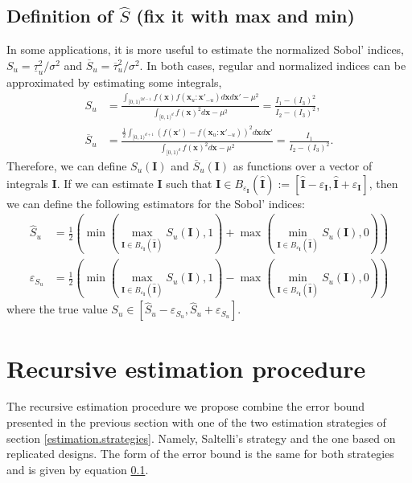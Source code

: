 \documentclass[]{elsarticle}
\theoremstyle{definition}
\newcommand{\bvec}[1]{\boldsymbol{#1}}
\newcommand{\vx}{\bvec{x}}
\newcommand{\vI}{\bvec{I}}
\begin{document}
\subsection{Definition of $\widehat{S}$ (fix it with max and min)}
In some applications, it is more useful to estimate the normalized Sobol' indices, $S_u = \underline{\tau}_u^2/\sigma^2$ and $\overline{S}_u = \overline{\tau}_u^2/\sigma^2$. In both cases, regular and normalized indices can be approximated by estimating some integrals,
\begin{align*}
S_u & = \frac{\int_{[0,1)^{2d-1}} f(\vx)f(\vx_{u}:{\vx'}_{-u})d\vx d{\vx'} - \mu^2 }{\int_{[0,1)^{d}} f(\vx)^2 d{\vx}-\mu^2} = \frac{I_1-(I_3)^2}{I_2-(I_3)^2}, \\
\overline{S}_u & = \frac{\frac{1}{2}\int_{[0,1)^{d+1}}(f(\vx')-f(\vx_u:{\vx'}_{-u}))^2d\vx d{\vx'}}{\int_{[0,1)^{d}} f(\vx)^2 d{\vx}-\mu^2} = \frac{I_1}{I_2-(I_3)^2}.
\end{align*}
Therefore, we can define $S_u(\vI)$ and $\overline{S}_u(\vI)$ as functions over a vector of integrals $\vI$. If we can estimate $\vI$ such that $\vI\in B_{\varepsilon_{\vI}}(\widehat{\vI}):=[\widehat{\vI}-\varepsilon_{\vI},\widehat{\vI}+\varepsilon_{\vI} ]$, then we can define the following estimators for the Sobol' indices:
\begin{align*}
\widehat{S}_u & = \frac{1}{2}\left(\min\left(\max_{\vI\in B_{\varepsilon_{\vI}}(\widehat{\vI})} S_u(\vI),1\right) + \max\left(\min_{\vI\in B_{\varepsilon_{\vI}}(\widehat{\vI})} S_u(\vI),0\right) \right) \\
\varepsilon_{S_u} & = \frac{1}{2}\left(\min\left(\max_{\vI\in B_{\varepsilon_{\vI}}(\widehat{\vI})} S_u(\vI),1\right) - \max\left(\min_{\vI\in B_{\varepsilon_{\vI}}(\widehat{\vI})} S_u(\vI),0\right) \right)
\end{align*}
where the true value $S_u\in [\widehat{S}_u - \varepsilon_{S_u}, \widehat{S}_u + \varepsilon_{S_u}]$.

\section{Recursive estimation procedure}
\label{section.recursive.procedure}

The recursive estimation procedure we propose combine the error bound presented in the previous section with one of the two estimation strategies of section \ref{estimation.strategies}. Namely, Saltelli's strategy and the one based on replicated designs. The form of the error bound is the same for both strategies and is given by equation \ref{}.
\end{document}
